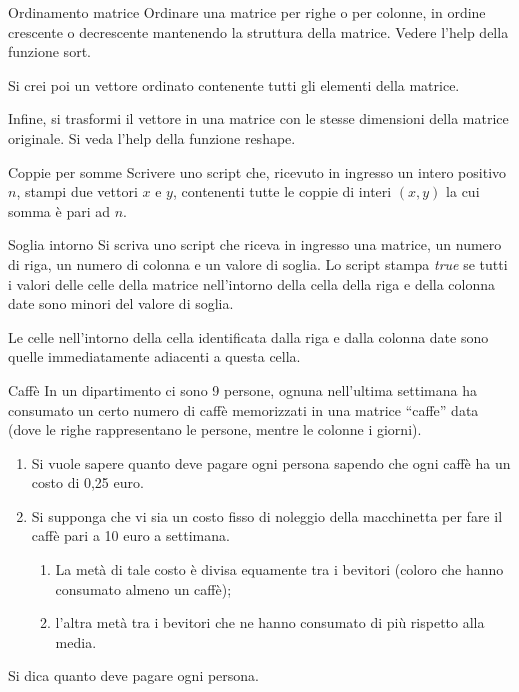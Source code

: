 \documentclass[aspectratio=169]{beamer}
\begin{document}
\begin{frame}{Ordinamento matrice}
Ordinare una matrice per righe o per colonne, in ordine crescente o decrescente mantenendo la struttura della matrice. Vedere l'help della funzione sort.

Si crei poi un vettore ordinato contenente tutti gli elementi della matrice.

Infine, si trasformi il vettore in una matrice con le stesse dimensioni della matrice originale. Si veda l'help della funzione reshape.
\end{frame}


\begin{frame}{Coppie per somme}
Scrivere uno script che, ricevuto in ingresso un intero positivo $n$, stampi due vettori $x$ e $y$, contenenti tutte le coppie di interi $(x,y)$ la cui somma è pari ad $n$.
\end{frame}

\begin{frame}{Soglia intorno}
Si scriva uno script che riceva in ingresso una matrice, un numero di riga, un numero di colonna e un valore di soglia.
    Lo script stampa \emph{true} se tutti i valori delle celle della matrice nell'intorno della cella della riga e della colonna date sono minori del valore di soglia.

Le celle nell'intorno della cella identificata dalla riga e dalla colonna date sono quelle immediatamente adiacenti a questa cella.
\end{frame}

\begin{frame}{Caffè}
In un dipartimento ci sono 9 persone, ognuna nell'ultima settimana ha
consumato un certo numero di caffè memorizzati in una matrice ``caffe'' data
(dove le righe rappresentano le persone, mentre le colonne i giorni).
\begin{enumerate}
	\item Si vuole sapere quanto deve pagare ogni persona sapendo che ogni caffè
	ha un costo di 0,25 euro.
	\item Si supponga che vi sia un costo fisso di noleggio della macchinetta per
	fare il caffè pari a 10 euro a settimana.
	\begin{enumerate}
		\item  La metà di tale costo è divisa equamente tra i bevitori (coloro che
		hanno consumato almeno un caffè);
		\item l'altra metà tra i bevitori che ne hanno consumato di più rispetto
		alla media.
	\end{enumerate}
\end{enumerate}

Si dica quanto deve pagare ogni persona.
\end{frame}
\end{document}
